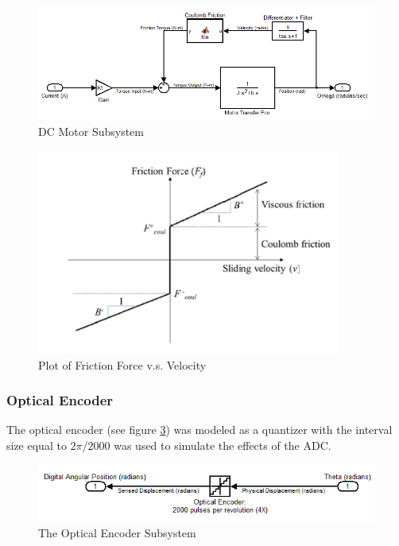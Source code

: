 \documentclass{article}
\theoremstyle{plain}
\theoremstyle{definition}
\theoremstyle{remark}
\begin{document}
\begin{figure}[htb]
\begin{center}
\includegraphics[width = 14cm]{q3_2}
\caption{DC Motor Subsystem}
\label{q3_2}
\end{center}
\end{figure}

\begin{figure}[htb]
\begin{center}
\includegraphics[width = 10cm]{q3_3}
\caption{Plot of Friction Force v.s. Velocity}
\label{q3_3}
\end{center}
\end{figure}

\clearpage

\subsubsection*{Optical Encoder}
The optical encoder (see figure \ref{q3_4}) was modeled as a quantizer with the interval size equal to $2\pi/2000$ was used to simulate the effects of the ADC.

\begin{figure}[htb]
\begin{center}
\includegraphics[width = 14cm]{q3_4}
\caption{The Optical Encoder Subsystem}
\label{q3_4}
\end{center}
\end{figure}
\end{document}
